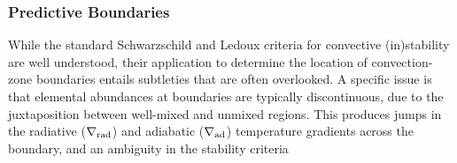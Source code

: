 {\color{brown}
\subsubsection{Predictive Boundaries}

While the standard Schwarzschild and Ledoux criteria for convective (in)stability are well understood, their application to determine the location of convection-zone boundaries entails subtleties that are often overlooked. A specific issue is that elemental abundances at boundaries are typically discontinuous, due to the juxtaposition between well-mixed and unmixed regions. This produces jumps in the radiative ($\nabla_{\rm rad}$) and adiabatic ($\nabla_{\rm ad}$) temperature gradients across the boundary, and an ambiguity in the stability criteria

}